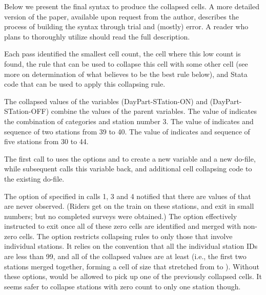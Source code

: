 Below we present the final syntax to produce the collapsed cells.
A more detailed version of the paper, available upon request from the author,
describes the process of building the syntax through trial and (mostly) error.
A reader who plans to thoroughly utilize  should
read the full description.

\begin{stlog}
\nullskip
\end{stlog}

Each pass identified the smallest cell count, the cell where this low count is found,
the rule that can be used to collapse this cell with some other cell (see more on determination
of what  believes to be the best rule below), and Stata code
that can be used to apply this collapsing rule.

The collapsed values of the variables  (DayPart-STation-ON) and
 (DayPart-STation-OFF) combine the values of the parent variables. The value
of  indicates the combination of categories
 and station number 3.
\label{page:dpston:nomenclature}
The value of  indicates
 and sequence of two stations from 39 to 40.
The value of  indicates  and sequence of
five stations from 30 to 44.

The first call to  uses the options 
and  to create a new variable and a new do-file,
while subsequent calls  this variable back, and  additional
cell collapsing code to the existing do-file.

The  option of  
specified in calls 1, 3 and 4 
notified  that there are values of  that
are never observed. (Riders get on the train on these stations, and exit in small numbers;
but no completed surveys were obtained.)
The  option effectively instructed  to exit
once all of these zero cells are identified and merged with non-zero cells. 
The  option
restricts collapsing rules to only those that involve individual stations.
It relies on the convention that all the individual station IDs are less than 99, 
and all of the collapsed values
are at least  (i.e., the first two stations merged together, forming
a cell of size  that stretched from  to ). Without these options,
 would be allowed to pick up one of the previously collapsed cells.
It seems safer to collapse stations with zero count to only one station though.

